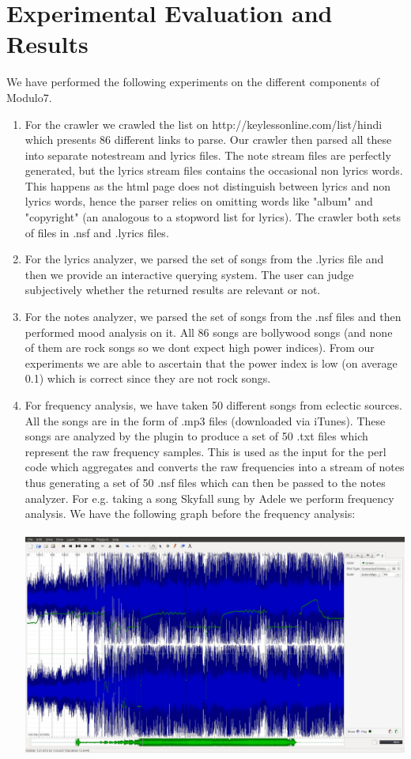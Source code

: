 \documentclass[letterpaper, 11pt]{article}
\begin{document}
\section*{Experimental Evaluation and Results}
We have performed the following experiments on the different components of Modulo7.
\begin{enumerate}
\item For the crawler we crawled the list on http://keylessonline.com/list/hindi which presents 86 different links to parse. Our crawler then parsed all these into separate notestream and lyrics files. The note stream files are perfectly generated, but the lyrics stream files contains the occasional non lyrics words. This happens as the html page does not distinguish between lyrics and non lyrics words, hence the parser relies on omitting words like "album" and "copyright" (an analogous to a stopword list for lyrics). The crawler both sets of files in .nsf and .lyrics files.
\item For the lyrics analyzer, we parsed the set of songs from the .lyrics file and then we provide an interactive querying system. The user can judge subjectively whether the returned results are relevant or not. 
\item For the notes analyzer, we parsed the set of songs from the .nsf files and then performed mood analysis on it. All 86 songs are bollywood songs (and none of them are rock songs so we dont expect high power indices). From our experiments we are able to ascertain that the power index is low (on average 0.1) which is correct since they are not rock songs. 
\item For frequency analysis, we have taken 50 different songs from eclectic sources. All the songs are in the form of .mp3 files (downloaded via iTunes). These songs are analyzed by the plugin to produce a set of 50 .txt files which represent the raw frequency samples. This is used as the input for the perl code which aggregates and converts the raw frequencies into a stream of notes thus generating a set of 50 .nsf files which can then be passed to the notes analyzer. For e.g. taking a song Skyfall sung by Adele we perform frequency analysis. We have the following graph before the frequency analysis:\\\\
\includegraphics[width=\textwidth]{after.jpg}\\\\

\end{enumerate}
\end{document}
